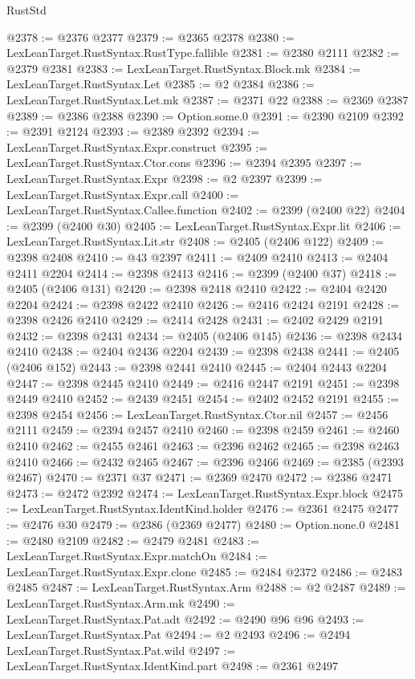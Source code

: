 \begin{lexlean}{RustStd}
\begin{coremodule}
{\begin{coremodule}
{{{{{{{{{{{{{{{{{{{{{{{{{{{{{{{{{{{{{{{{{{{{{{{{{{@2378 := @2376 @2377
@2379 := @2365 @2378
@2380 := LexLeanTarget.RustSyntax.RustType.fallible
@2381 := @2380 @2111
@2382 := @2379 @2381
@2383 := LexLeanTarget.RustSyntax.Block.mk
@2384 := LexLeanTarget.RustSyntax.Let
@2385 := @2 @2384
@2386 := LexLeanTarget.RustSyntax.Let.mk
@2387 := @2371 @22
@2388 := @2369 @2387
@2389 := @2386 @2388
@2390 := Option.some.{0}
@2391 := @2390 @2109
@2392 := @2391 @2124
@2393 := @2389 @2392
@2394 := LexLeanTarget.RustSyntax.Expr.construct
@2395 := LexLeanTarget.RustSyntax.Ctor.cons
@2396 := @2394 @2395
@2397 := LexLeanTarget.RustSyntax.Expr
@2398 := @2 @2397
@2399 := LexLeanTarget.RustSyntax.Expr.call
@2400 := LexLeanTarget.RustSyntax.Callee.function
@2402 := @2399 (@2400 @22)
@2404 := @2399 (@2400 @30)
@2405 := LexLeanTarget.RustSyntax.Expr.lit
@2406 := LexLeanTarget.RustSyntax.Lit.str
@2408 := @2405 (@2406 @122)
@2409 := @2398 @2408
@2410 := @43 @2397
@2411 := @2409 @2410
@2413 := @2404 @2411 @2204
@2414 := @2398 @2413
@2416 := @2399 (@2400 @37)
@2418 := @2405 (@2406 @131)
@2420 := @2398 @2418 @2410
@2422 := @2404 @2420 @2204
@2424 := @2398 @2422 @2410
@2426 := @2416 @2424 @2191
@2428 := @2398 @2426 @2410
@2429 := @2414 @2428
@2431 := @2402 @2429 @2191
@2432 := @2398 @2431
@2434 := @2405 (@2406 @145)
@2436 := @2398 @2434 @2410
@2438 := @2404 @2436 @2204
@2439 := @2398 @2438
@2441 := @2405 (@2406 @152)
@2443 := @2398 @2441 @2410
@2445 := @2404 @2443 @2204
@2447 := @2398 @2445 @2410
@2449 := @2416 @2447 @2191
@2451 := @2398 @2449 @2410
@2452 := @2439 @2451
@2454 := @2402 @2452 @2191
@2455 := @2398 @2454
@2456 := LexLeanTarget.RustSyntax.Ctor.nil
@2457 := @2456 @2111
@2459 := @2394 @2457 @2410
@2460 := @2398 @2459
@2461 := @2460 @2410
@2462 := @2455 @2461
@2463 := @2396 @2462
@2465 := @2398 @2463 @2410
@2466 := @2432 @2465
@2467 := @2396 @2466
@2469 := @2385 (@2393 @2467)
@2470 := @2371 @37
@2471 := @2369 @2470
@2472 := @2386 @2471
@2473 := @2472 @2392
@2474 := LexLeanTarget.RustSyntax.Expr.block
@2475 := LexLeanTarget.RustSyntax.IdentKind.holder
@2476 := @2361 @2475
@2477 := @2476 @30
@2479 := @2386 (@2369 @2477)
@2480 := Option.none.{0}
@2481 := @2480 @2109
@2482 := @2479 @2481
@2483 := LexLeanTarget.RustSyntax.Expr.matchOn
@2484 := LexLeanTarget.RustSyntax.Expr.clone
@2485 := @2484 @2372
@2486 := @2483 @2485
@2487 := LexLeanTarget.RustSyntax.Arm
@2488 := @2 @2487
@2489 := LexLeanTarget.RustSyntax.Arm.mk
@2490 := LexLeanTarget.RustSyntax.Pat.adt
@2492 := @2490 @96 @96
@2493 := LexLeanTarget.RustSyntax.Pat
@2494 := @2 @2493
@2496 := @2494 LexLeanTarget.RustSyntax.Pat.wild
@2497 := LexLeanTarget.RustSyntax.IdentKind.part
@2498 := @2361 @2497
}}}}}}}}}}}}}}}}}}}}}}}}}}}}}}}}}}}}}}}}}}}}}}}}}}
\end{coremodule}}
\end{coremodule}
\end{lexlean}
